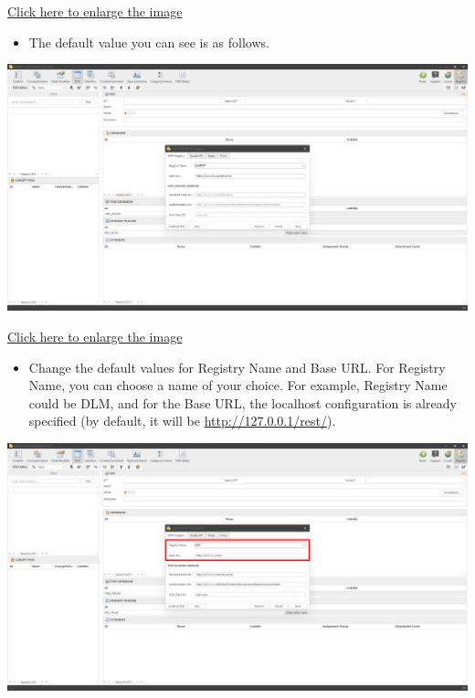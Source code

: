 \documentclass[
]{book}
\providecommand{\tightlist}{%
  \setlength{\itemsep}{0pt}\setlength{\parskip}{0pt}}
\begin{document}
\href{images/image208.png}{Click here to enlarge the image}

\begin{itemize}
\tightlist
\item
  The default value you can see is as follows.
\end{itemize}

\begin{center}\includegraphics[width=1\linewidth]{./images/image210} \end{center}

\href{images/image210.png}{Click here to enlarge the image}

\begin{itemize}
\tightlist
\item
  Change the default values for Registry Name and Base URL. For Registry Name, you can choose a name of your choice. For example, Registry Name could be DLM, and for the Base URL, the localhost configuration is already specified (by default, it will be \url{http://127.0.0.1/rest/}).
\end{itemize}

\begin{center}\includegraphics[width=1\linewidth]{./images/image212} \end{center}
\end{document}
